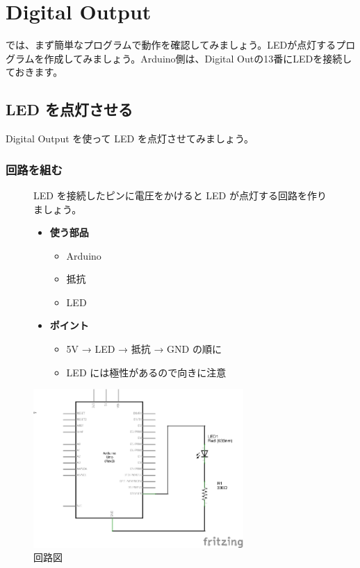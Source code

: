 \documentclass[11pt,a4paper]{jarticle}
\begin{document}
\section{Digital Output}
では、まず簡単なプログラムで動作を確認してみましょう。LEDが点灯するプログラムを作成してみましょう。Arduino側は、Digital Outの13番にLEDを接続しておきます。

\subsection{LED を点灯させる}
Digital Output を使って LED を点灯させてみましょう。

\subsubsection*{回路を組む}
\begin{figure}[h!]
 \begin{minipage}{0.5\columnwidth}
  LED を接続したピンに電圧をかけると LED が点灯する回路を作りましょう。
  \begin{itemize}
   \item \textbf{使う部品}
	 \begin{itemize}
	  \item Arduino
	  \item 抵抗
	  \item LED
	 \end{itemize}
   \item \textbf{ポイント}
	 \begin{itemize}
	  \item 5V → LED → 抵抗 → GND の順に
	  \item LED には極性があるので向きに注意
	 \end{itemize}
  \end{itemize}
 \end{minipage}
 \begin{minipage}{0.5\columnwidth}
  \centering
  \includegraphics[width=80mm]{img/02_led.eps}
  \caption{回路図}
 \end{minipage}
\end{figure}
\end{document}
